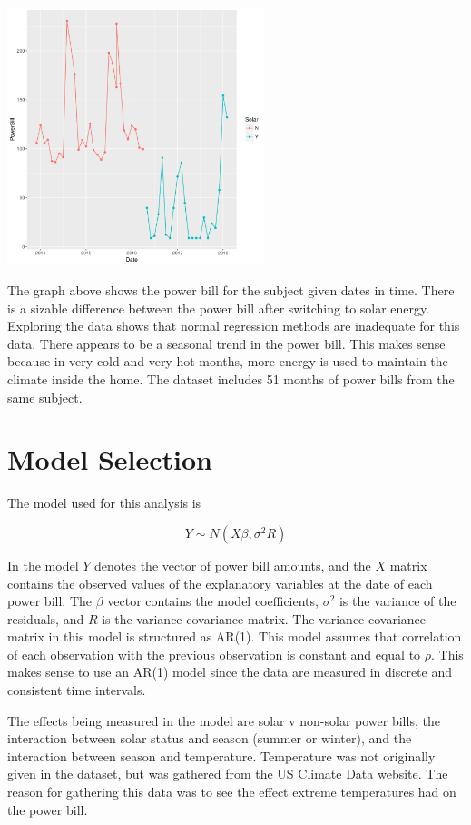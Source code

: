 \documentclass{svproc}
\begin{document}
\begin{center}
\includegraphics [height=7.5cm]{solar_data.pdf}
\end{center}

The graph above shows the power bill for the subject given dates in time. There is a sizable difference between the power bill after switching to solar energy. Exploring the data shows that normal regression methods are inadequate for this data. There appears to be a seasonal trend in the power bill. This makes sense because in very cold and very hot months, more energy is used to maintain the climate inside the home. The dataset includes 51 months of power bills from the same subject. 

\section{Model Selection}

The model used for this analysis is 

\begin{equation}
 Y \sim N(X\beta, \sigma^2R)
\end{equation}

In the model $Y$ denotes the vector of power bill amounts, and the $X$ matrix contains the observed values of the explanatory variables at the date of each power bill. The $\beta$ vector contains the model coefficients, $\sigma^2$ is the variance of the residuals, and $R$ is the variance covariance matrix. The variance covariance matrix in this model is structured as AR(1). This model assumes that correlation of each observation with the previous observation is constant and equal to $\rho$. This makes sense to use an AR(1) model since the data are measured in discrete and consistent time intervals.

The effects being measured in the model are solar v non-solar power bills, the interaction between solar status and season (summer or winter), and the interaction between season and temperature. Temperature was not originally given in the dataset, but was gathered from the US Climate Data website. The reason for gathering this data was to see the effect extreme temperatures had on the power bill.
\end{document}
